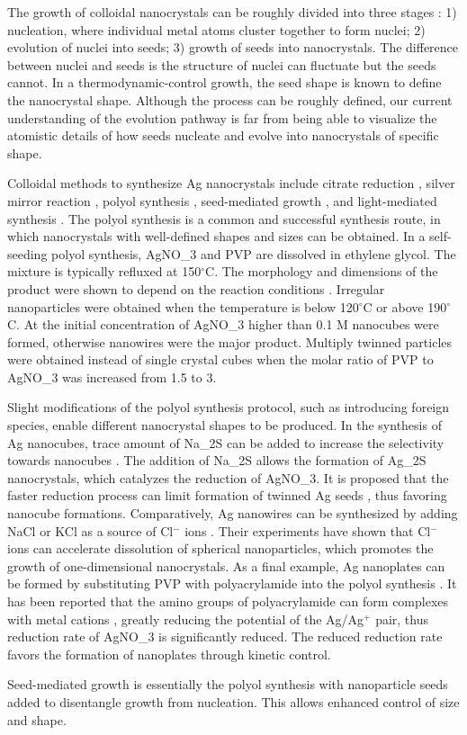 The growth of colloidal nanocrystals can be roughly divided into three stages \cite{Xia_2008}:
1) nucleation, where individual metal atoms cluster together to form nuclei;
2) evolution of nuclei into seeds;
3) growth of seeds into nanocrystals.
The difference between nuclei and seeds is the structure of nuclei can fluctuate but the seeds cannot.
In a thermodynamic-control growth, the seed shape is known to define the nanocrystal shape.
Although the process can be roughly defined, our current understanding of the evolution pathway is far from being able to visualize the atomistic details of how seeds nucleate and evolve into nanocrystals of specific shape.

Colloidal methods to synthesize Ag nanocrystals include citrate reduction \cite{Wu_2008,Lee_1982}, silver mirror reaction \cite{Yin_2002}, polyol synthesis \cite{Wiley_2008,Sun_2002}, seed-mediated growth \cite{Pietrobon_2009,Sun_2002,Zhang_2010}, and light-mediated synthesis \cite{Pietrobon_2008,Jin_2003,Zhou_2008}.
The polyol synthesis is a common and successful synthesis route, in which nanocrystals with well-defined shapes and sizes can be obtained.
In a self-seeding polyol synthesis, AgNO_3 and PVP are dissolved in ethylene glycol.
The mixture is typically refluxed at 150$^{\circ}$C.
The morphology and dimensions of the product were shown to depend on the reaction conditions \cite{Sun_2002}.
Irregular nanoparticles were obtained when the temperature is below 120$^{\circ}$C or above 190$^{\circ}$C.
At the initial concentration of AgNO_3 higher than 0.1 M nanocubes were formed, otherwise nanowires were the major product.
Multiply twinned particles were obtained instead of single crystal cubes when the molar ratio of PVP to AgNO_3 was increased from 1.5 to 3.

Slight modifications of the polyol synthesis protocol, such as introducing foreign species, enable different nanocrystal shapes to be produced.
In the synthesis of Ag nanocubes, trace amount of Na_2S can be added to increase the selectivity towards nanocubes \cite{Skrabalak_2007}.
The addition of Na_2S allows the formation of Ag_2S nanocrystals, which catalyzes the reduction of AgNO_3.
It is proposed that the faster reduction process can limit formation of twinned Ag seeds \cite{Wiley_2006}, thus favoring nanocube formations.
Comparatively, Ag nanowires can be synthesized by adding NaCl or KCl as a source of Cl$^-$ ions \cite{Tsuji_2008}.
Their experiments have shown that Cl$^-$ ions can accelerate dissolution of spherical nanoparticles, which promotes the growth of one-dimensional nanocrystals.
As a final example, Ag nanoplates can be formed by substituting PVP with polyacrylamide into the polyol synthesis \cite{Xiong_2007}.
It has been reported that the amino groups of polyacrylamide can form complexes with metal cations \cite{Sari_2006}, greatly reducing the potential of the Ag/Ag$^+$ pair, thus reduction rate of AgNO_3 is significantly reduced.
The reduced reduction rate favors the formation of nanoplates through kinetic control.

Seed-mediated growth is essentially the polyol synthesis with nanoparticle seeds added to disentangle growth from nucleation.
This allows enhanced control of size and shape.
  
  
  
  
  
  
  
  
  